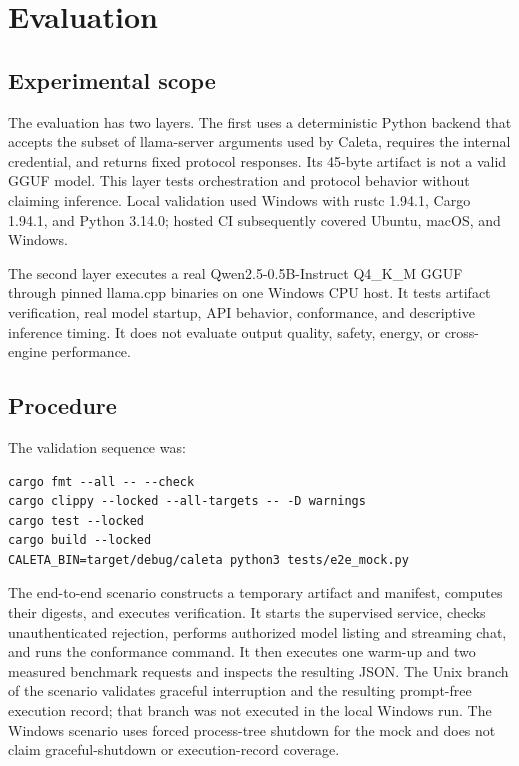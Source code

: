 \documentclass[11pt,a4paper]{article}
\begin{document}
\section{Evaluation}

\subsection{Experimental scope}

The evaluation has two layers. The first uses a deterministic Python backend that accepts the subset of llama-server arguments used by Caleta, requires the internal credential, and returns fixed protocol responses. Its 45-byte artifact is not a valid GGUF model. This layer tests orchestration and protocol behavior without claiming inference. Local validation used Windows with rustc 1.94.1, Cargo 1.94.1, and Python 3.14.0; hosted CI subsequently covered Ubuntu, macOS, and Windows.

The second layer executes a real Qwen2.5-0.5B-Instruct Q4\_K\_M GGUF through pinned llama.cpp binaries on one Windows CPU host. It tests artifact verification, real model startup, API behavior, conformance, and descriptive inference timing. It does not evaluate output quality, safety, energy, or cross-engine performance.

\subsection{Procedure}

The validation sequence was:

\begin{lstlisting}
cargo fmt --all -- --check
cargo clippy --locked --all-targets -- -D warnings
cargo test --locked
cargo build --locked
CALETA_BIN=target/debug/caleta python3 tests/e2e_mock.py
\end{lstlisting}

The end-to-end scenario constructs a temporary artifact and manifest, computes their digests, and executes verification. It starts the supervised service, checks unauthenticated rejection, performs authorized model listing and streaming chat, and runs the conformance command. It then executes one warm-up and two measured benchmark requests and inspects the resulting JSON. The Unix branch of the scenario validates graceful interruption and the resulting prompt-free execution record; that branch was not executed in the local Windows run. The Windows scenario uses forced process-tree shutdown for the mock and does not claim graceful-shutdown or execution-record coverage.
\end{document}
